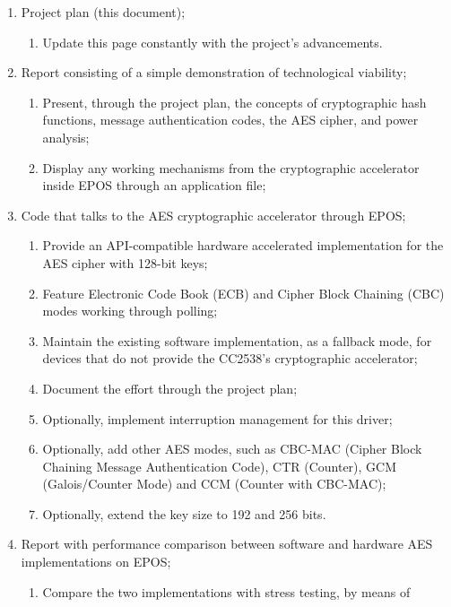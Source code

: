 \documentclass{../sftex/sftex}
\begin{document}
\begin{enumerate}
  \item Project plan (this document);
  \begin{enumerate}
    \item Update this page constantly with the project's advancements.
  \end{enumerate}
  \item Report consisting of a simple demonstration of technological viability;
  \begin{enumerate}
    \item Present, through the project plan, the concepts of cryptographic hash
        functions, message authentication codes, the AES cipher, and power
          analysis;
    \item Display any working mechanisms from the cryptographic accelerator
        inside EPOS through an application file;
  \end{enumerate}
  \item Code that talks to the AES cryptographic accelerator through EPOS\@;
  \begin{enumerate}
    \item Provide an API-compatible hardware accelerated implementation for the
        AES cipher with 128-bit keys;
    \item Feature Electronic Code Book (ECB) and Cipher Block Chaining (CBC)
        modes working through polling;
    \item Maintain the existing software implementation, as a fallback mode,
        for devices that do not provide the CC2538's cryptographic accelerator;
    \item Document the effort through the project plan;
    \item Optionally, implement interruption management for this driver;
    \item Optionally, add other AES modes, such as CBC-MAC (Cipher Block
        Chaining Message Authentication Code), CTR (Counter), GCM
          (Galois/Counter Mode) and CCM (Counter with CBC-MAC);
    \item Optionally, extend the key size to 192 and 256 bits.
  \end{enumerate}
  \item Report with performance comparison between software and hardware AES
    implementations on EPOS\@;
  \begin{enumerate}
    \item Compare the two implementations with stress testing, by means of

\end{enumerate}
\end{enumerate}
\end{document}
